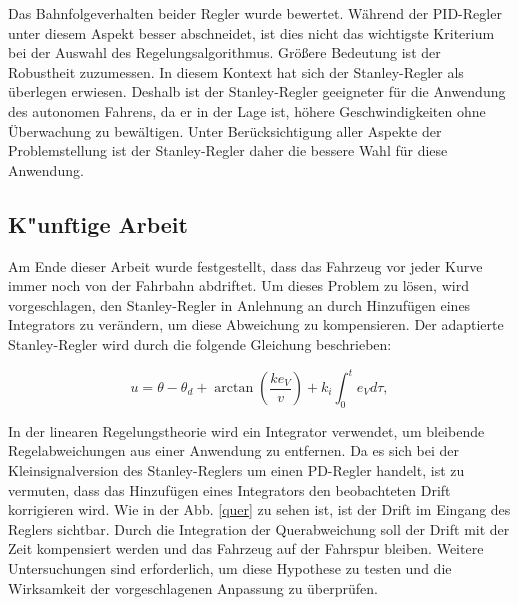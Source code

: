 \documentclass[arbeit=studie,oneside,BCOR=12mm]{ArbeitRST}
\begin{document}
Das Bahnfolgeverhalten beider Regler wurde bewertet. Während der PID-Regler
unter diesem Aspekt besser abschneidet, ist dies nicht das wichtigste Kriterium
bei der Auswahl des Regelungsalgorithmus. Größere Bedeutung ist der Robustheit
zuzumessen. In diesem Kontext hat sich der Stanley-Regler als überlegen
erwiesen. Deshalb ist der Stanley-Regler geeigneter für die Anwendung des
autonomen Fahrens, da er in der Lage ist, höhere Geschwindigkeiten ohne
Überwachung zu bewältigen. Unter Berücksichtigung aller Aspekte der
Problemstellung ist der Stanley-Regler daher die bessere Wahl für diese
Anwendung.




\subsection{K"unftige Arbeit}

Am Ende dieser Arbeit wurde festgestellt, dass das Fahrzeug vor jeder Kurve
immer noch von der Fahrbahn abdriftet. Um dieses Problem zu lösen, wird
vorgeschlagen, den Stanley-Regler in Anlehnung an \cite{iglied} durch
Hinzufügen eines Integrators zu verändern, um diese Abweichung zu kompensieren.
Der adaptierte Stanley-Regler wird durch die folgende Gleichung beschrieben:

\begin{equation}
    u = \theta - \theta_d + \arctan\left(\frac{ke_{V}}{v}\right) + k_{i} \int_{0}^{t} e_{V}d\tau,
    \label{eq:Stanley-Regler-adjusted}
\end{equation}

In der linearen Regelungstheorie wird ein Integrator verwendet, um bleibende
Regelabweichungen aus einer Anwendung zu entfernen. Da es sich bei der
Kleinsignalversion des Stanley-Reglers um einen PD-Regler handelt, ist zu
vermuten, dass das Hinzufügen eines Integrators den beobachteten Drift
korrigieren wird. Wie in der Abb. \ref{quer} zu sehen ist, ist der Drift im Eingang
des Reglers sichtbar. Durch die Integration der Querabweichung soll der Drift
mit der Zeit kompensiert werden und das Fahrzeug auf der Fahrspur bleiben.
Weitere Untersuchungen sind erforderlich, um diese Hypothese zu testen und die
Wirksamkeit der vorgeschlagenen Anpassung zu überprüfen.
\end{document}
